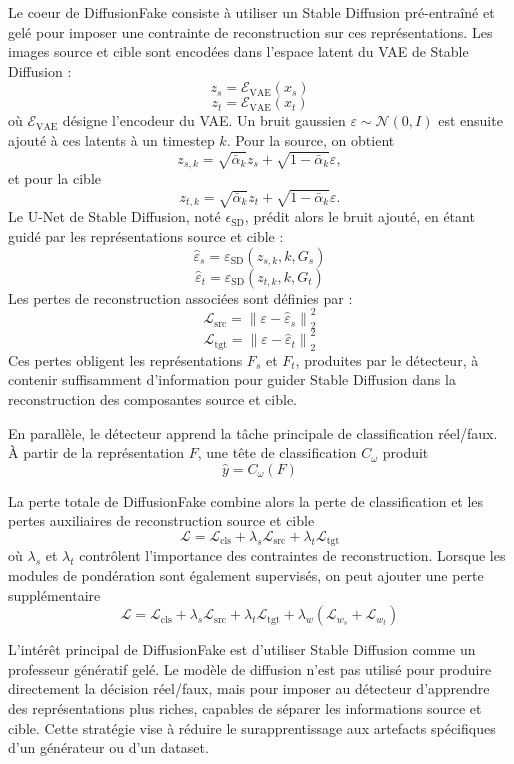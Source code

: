 \documentclass[runningheads]{llncs}
\begin{document}
Le coeur de DiffusionFake consiste à utiliser un Stable Diffusion pré-entraîné et gelé pour imposer une contrainte de reconstruction sur ces représentations. Les images source et cible sont encodées dans l'espace latent du VAE de Stable Diffusion :
$$
    z_s = \mathcal{E}_{\text{VAE}}(x_s)
$$
$$
    z_t = \mathcal{E}_{\text{VAE}}(x_t)
$$
où $\mathcal{E}_{\text{VAE}}$ désigne l'encodeur du VAE. Un bruit gaussien $\varepsilon \sim \mathcal{N}(0,I)$ est ensuite ajouté à ces latents à un timestep $k$. Pour la source, on obtient 
$$
    z_{s,k}=\sqrt{\bar{\alpha}_k}z_s+\sqrt{1-\bar{\alpha}_k}\varepsilon,
$$
et pour la cible 
$$
    z_{t,k}=\sqrt{\bar{\alpha}_k}z_t+\sqrt{1-\bar{\alpha}_k}\varepsilon.
$$
Le U-Net de Stable Diffusion, noté \(\epsilon_{\text{SD}}\), prédit alors le bruit ajouté, en étant guidé par les représentations source et cible :
$$
    \hat{\varepsilon}_s=\varepsilon_{\text{SD}}\left(z_{s,k}, k, G_s\right)
$$
$$
    \hat{\varepsilon}_t=\varepsilon_{\text{SD}}\left(z_{t,k}, k, G_t\right)
$$
Les pertes de reconstruction associées sont définies par :
$$
    \mathcal{L}_{\text{src}}=\left\|\varepsilon-\hat{\varepsilon}_s\right\|_2^2
$$
$$
    \mathcal{L}_{\text{tgt}}=\left\|\varepsilon-\hat{\varepsilon}_t\right\|_2^2
$$
Ces pertes obligent les représentations $F_s$ et $F_t$, produites par le détecteur, à contenir suffisamment d'information pour guider Stable Diffusion dans la reconstruction des composantes source et cible.

En parallèle, le détecteur apprend la tâche principale de classification réel/faux. À partir de la représentation $F$, une tête de classification $C_\omega$ produit 
$$
    \hat{y}=C_\omega(F)
$$


La perte totale de DiffusionFake combine alors la perte de classification et les pertes auxiliaires de reconstruction source et cible 
$$
    \mathcal{L}=\mathcal{L}_{\text{cls}}+\lambda_s \mathcal{L}_{\text{src}}+\lambda_t \mathcal{L}_{\text{tgt}}
$$
où $\lambda_s$ et $\lambda_t$ contrôlent l'importance des contraintes de reconstruction. Lorsque les modules de pondération sont également supervisés, on peut ajouter une perte supplémentaire 
$$
    \mathcal{L}=\mathcal{L}_{\text{cls}}+\lambda_s \mathcal{L}_{\text{src}}+\lambda_t \mathcal{L}_{\text{tgt}}+\lambda_w\left(\mathcal{L}_{w_s}+\mathcal{L}_{w_t}\right)
$$

L'intérêt principal de DiffusionFake est d'utiliser Stable Diffusion comme un professeur génératif gelé. Le modèle de diffusion n'est pas utilisé pour produire directement la décision réel/faux, mais pour imposer au détecteur d'apprendre des représentations plus riches, capables de séparer les informations source et cible. Cette stratégie vise à réduire le surapprentissage aux artefacts spécifiques d'un générateur ou d'un dataset.
\end{document}
